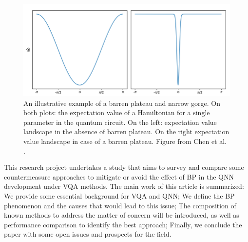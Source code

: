 \begin{figure}[h]
    \centering
    \includegraphics[width=\textwidth]{src/Appendices/example-of-a-barren-plateau.png}
    \caption{
        An illustrative example of a barren plateau and narrow gorge.
        On both plots: the expectation value of a Hamiltonian for a single parameter in the quantum circuit.
        On the left: expectation value landscape in the absence of barren plateau. 
        On the right expectation value landscape in case of a barren plateau.
        Figure from Chen et al. \cite{tillyVariationalQuantumEigensolver2021}.
    }
    \label{fig: Barren Plateau Example}
\end{figure}



This research project undertakes a study that aims to survey and compare some countermeasure approaches to mitigate or avoid the effect of BP in the QNN development under VQA methods. 
The main work of this article is summarized: 
We provide some essential background for VQA and QNN;
We define the BP phenomenon and the causes that would lead to this issue; 
The composition of known methods to address the matter of concern will be introduced, as well as performance comparison to identify the best approach; 
Finally, we conclude the paper with some open issues and prospects for the field.

